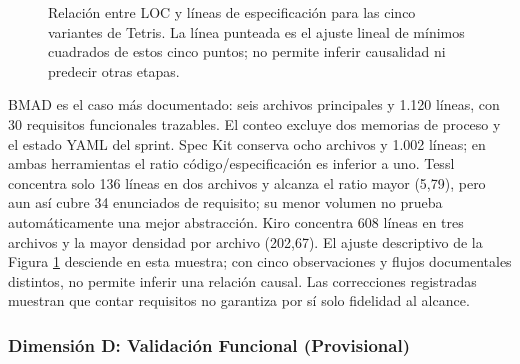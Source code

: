 \begin{figure}[H]
\centering
{}
\caption{Relación entre LOC y líneas de especificación para las cinco variantes de Tetris. La línea punteada es el ajuste lineal de mínimos cuadrados de estos cinco puntos; no permite inferir causalidad ni predecir otras etapas.}
\label{fig:scatter_tetris_init}
\end{figure}

BMAD es el caso más documentado: seis archivos principales y 1.120 líneas, con 30 requisitos funcionales trazables. El conteo excluye dos memorias de proceso y el estado YAML del sprint. Spec Kit conserva ocho archivos y 1.002 líneas; en ambas herramientas el ratio código/especificación es inferior a uno. Tessl concentra solo 136 líneas en dos archivos y alcanza el ratio mayor (5,79), pero aun así cubre 34 enunciados de requisito; su menor volumen no prueba automáticamente una mejor abstracción. Kiro concentra 608 líneas en tres archivos y la mayor densidad por archivo (202,67). El ajuste descriptivo de la Figura \ref{fig:scatter_tetris_init} desciende en esta muestra; con cinco observaciones y flujos documentales distintos, no permite inferir una relación causal. Las correcciones registradas muestran que contar requisitos no garantiza por sí solo fidelidad al alcance.

\subsubsection{Dimensión D: Validación Funcional (Provisional)}

